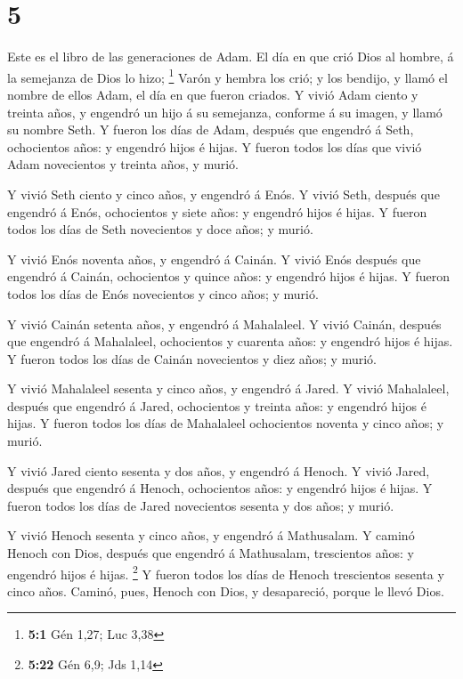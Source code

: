 \hypertarget{section-4}{%
\section{5}\label{section-4}}

 Este es el libro de las generaciones de Adam. El día en que
crió Dios al hombre, á la semejanza de Dios lo hizo; \footnote{\textbf{5:1}
  Gén 1,27; Luc 3,38}  Varón y hembra los crió; y los
bendijo, y llamó el nombre de ellos Adam, el día en que fueron criados.
 Y vivió Adam ciento y treinta años, y engendró un hijo á su
semejanza, conforme á su imagen, y llamó su nombre Seth.  Y
fueron los días de Adam, después que engendró á Seth, ochocientos años:
y engendró hijos é hijas.  Y fueron todos los días que vivió
Adam novecientos y treinta años, y murió.

 Y vivió Seth ciento y cinco años, y engendró á Enós.
 Y vivió Seth, después que engendró á Enós, ochocientos y
siete años: y engendró hijos é hijas.  Y fueron todos los
días de Seth novecientos y doce años; y murió.

 Y vivió Enós noventa años, y engendró á Cainán.
 Y vivió Enós después que engendró á Cainán, ochocientos y
quince años: y engendró hijos é hijas.  Y fueron todos los
días de Enós novecientos y cinco años; y murió.

 Y vivió Cainán setenta años, y engendró á Mahalaleel.
 Y vivió Cainán, después que engendró á Mahalaleel,
ochocientos y cuarenta años: y engendró hijos é hijas.  Y
fueron todos los días de Cainán novecientos y diez años; y murió.

 Y vivió Mahalaleel sesenta y cinco años, y engendró á
Jared.  Y vivió Mahalaleel, después que engendró á Jared,
ochocientos y treinta años: y engendró hijos é hijas.  Y
fueron todos los días de Mahalaleel ochocientos noventa y cinco años; y
murió.

 Y vivió Jared ciento sesenta y dos años, y engendró á
Henoch.  Y vivió Jared, después que engendró á Henoch,
ochocientos años: y engendró hijos é hijas.  Y fueron todos
los días de Jared novecientos sesenta y dos años; y murió.

 Y vivió Henoch sesenta y cinco años, y engendró á
Mathusalam.  Y caminó Henoch con Dios, después que engendró
á Mathusalam, trescientos años: y engendró hijos é hijas. \footnote{\textbf{5:22}
  Gén 6,9; Jds 1,14}  Y fueron todos los días de Henoch
trescientos sesenta y cinco años.  Caminó, pues, Henoch con
Dios, y desapareció, porque le llevó Dios.

